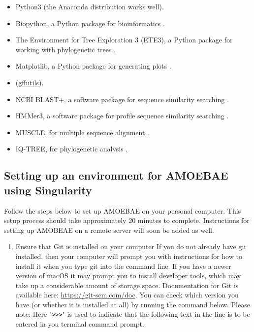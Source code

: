 \documentclass[12pt,letterpaper]{article}
\begin{document}
\begin{linenumbers}
\begin{itemize}

\item Python3 (the Anaconda distribution works well).

\item Biopython, a Python package for bioinformatics \citep{cock2009}.

\item The Environment for Tree Exploration 3 (ETE3), a Python package for
    working with phylogenetic trees \citep{huerta-cepas2016}.

\item Matplotlib, a Python package for generating plots \citep{hunter2007}.

\item (\href{https://pythonhosted.org/gffutils/}{gffutils}).

\item NCBI BLAST+, a software package for sequence similarity searching \citep{camacho2009}.

\item HMMer3, a software package for profile sequence similarity searching \citep{eddy1998}.

\item MUSCLE, for multiple sequence alignment \citep{edgar2004}.

\item IQ-TREE, for phylogenetic analysis \citep{nguyen2015}.


\end{itemize}


\subsection{Setting up an environment for AMOEBAE using Singularity}
\label{setup_section}


Follow the steps below to set up AMOEBAE on your personal computer. This setup
process should take approximately 20 minutes to complete. Instructions for
setting up AMOBEAE on a remote server will soon be added as well.

\begin{enumerate}

\item Ensure that Git is installed on your computer If you do not already have
    git installed, then your computer will prompt you with instructions for how
        to install it when you type git into the command line. If you have a
        newer version of macOS it may prompt you to install developer tools,
        which may take up a considerable amount of storage space. Documentation
        for Git is available here: \url{https://git-scm.com/doc}. You can check
        which version you have (or whether it is installed at all) by running
        the command below. Please note: Here "\texttt{>{}>{}>}" is
        used to indicate that the following text in the line is to be entered
        in you terminal command prompt. 


\end{enumerate}
\end{linenumbers}
\end{document}
